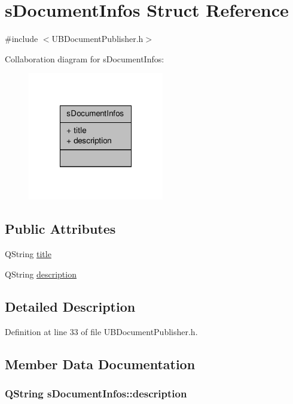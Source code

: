 \hypertarget{structs_document_infos}{\section{s\-Document\-Infos Struct Reference}
\label{d4/d55/structs_document_infos}
}


{\ttfamily \#include $<$U\-B\-Document\-Publisher.\-h$>$}



Collaboration diagram for s\-Document\-Infos\-:
\nopagebreak
\begin{figure}[H]
\begin{center}
\leavevmode
\includegraphics[width=168pt]{d2/de9/structs_document_infos__coll__graph}
\end{center}
\end{figure}
\subsection*{Public Attributes}
\begin{DoxyCompactItemize}
\item 
Q\-String \hyperlink{structs_document_infos_af5c9a5ab7a6a10f869ef7d9c06b472e7}{title}
\item 
Q\-String \hyperlink{structs_document_infos_a737608f157499ca87f256f5a67336357}{description}
\end{DoxyCompactItemize}


\subsection{Detailed Description}


Definition at line 33 of file U\-B\-Document\-Publisher.\-h.



\subsection{Member Data Documentation}
\hypertarget{structs_document_infos_a737608f157499ca87f256f5a67336357}{
\subsubsection[{description}]{\setlength{\rightskip}{0pt plus 5cm}Q\-String s\-Document\-Infos\-::description}}\label{d4/d55/structs_document_infos_a737608f157499ca87f256f5a67336357}


